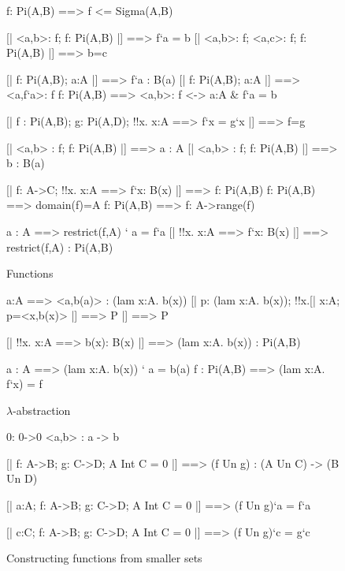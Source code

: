 
\begin{figure}
\begin{ttbox}
      f: Pi(A,B) ==> f <= Sigma(A,B)

  [| <a,b>: f;  f: Pi(A,B) |] ==> f`a = b
 [| <a,b>: f;  <a,c>: f;  f: Pi(A,B) |] ==> b=c

      [| f: Pi(A,B);  a:A |] ==> f`a : B(a)
      [| f: Pi(A,B);  a:A |] ==> <a,f`a>: f
       f: Pi(A,B) ==> <a,b>: f <-> a:A & f`a = b

   [| f : Pi(A,B);  g: Pi(A,D);
                   !!x. x:A ==> f`x = g`x     |] ==> f=g

     [| <a,b> : f;  f: Pi(A,B) |] ==> a : A
      [| <a,b> : f;  f: Pi(A,B) |] ==> b : B(a)

         [| f: A->C;  !!x. x:A ==> f`x: B(x) |] ==> f: Pi(A,B)
   f: Pi(A,B) ==> domain(f)=A
    f: Pi(A,B) ==> f: A->range(f)

        a : A ==> restrict(f,A) ` a = f`a
   [| !!x. x:A ==> f`x: B(x) |] ==> 
                restrict(f,A) : Pi(A,B)
\end{ttbox}
\caption{Functions} \label{zf-func1}
\end{figure}


\begin{figure}
\begin{ttbox}
         a:A ==> <a,b(a)> : (lam x:A. b(x))
         [| p: (lam x:A. b(x));  !!x.[| x:A; p=<x,b(x)> |] ==> P 
             |] ==>  P

     [| !!x. x:A ==> b(x): B(x) |] ==> (lam x:A. b(x)) : Pi(A,B)

         a : A ==> (lam x:A. b(x)) ` a = b(a)
          f : Pi(A,B) ==> (lam x:A. f`x) = f
\end{ttbox}
\caption{$\lambda$-abstraction} \label{zf-lam}
\end{figure}


\begin{figure}
\begin{ttbox}
            0: 0->0
           {\ttlbrace}<a,b>{\ttrbrace} : {\ttlbrace}a{\ttrbrace} -> {\ttlbrace}b{\ttrbrace}

      [| f: A->B;  g: C->D;  A Int C = 0  |] ==>  
                     (f Un g) : (A Un C) -> (B Un D)

  [| a:A;  f: A->B;  g: C->D;  A Int C = 0 |] ==>  
                     (f Un g)`a = f`a

  [| c:C;  f: A->B;  g: C->D;  A Int C = 0 |] ==>  
                     (f Un g)`c = g`c
\end{ttbox}
\caption{Constructing functions from smaller sets} \label{zf-func2}
\end{figure}



